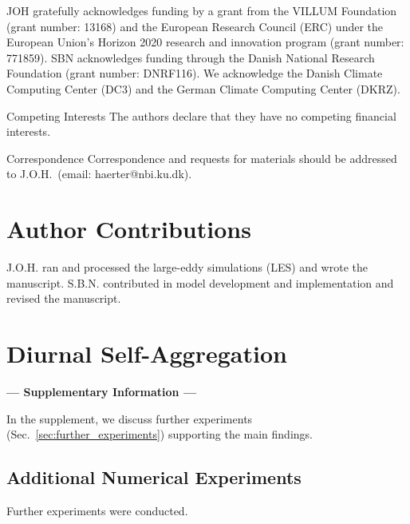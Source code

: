 \documentclass{article}
\begin{document}
\begin{addendum}
 \item JOH gratefully acknowledges funding by a grant from the VILLUM Foundation (grant number: 13168) and the European Research Council (ERC) under the European Union's Horizon 2020 research and innovation program (grant number: 771859). SBN acknowledges funding through the Danish National Research Foundation (grant number: DNRF116).
We acknowledge the Danish Climate Computing Center (DC3) and the German Climate Computing Center (DKRZ).
 \item[Competing Interests] The authors declare that they have no
competing financial interests.
 \item[Correspondence] Correspondence and requests for materials
should be addressed to J.O.H.~(email: haerter@nbi.ku.dk).
\end{addendum}

\section*{Author Contributions}
\noindent
J.O.H. ran and processed the large-eddy simulations (LES) and wrote the manuscript. S.B.N. contributed in model development and implementation and revised the manuscript.

\clearpage
\newpage
\pagebreak


\pagebreak
\clearpage

\renewcommand{\theequation}{S\arabic{equation}}
\renewcommand{\thesection}{S\arabic{section}}
\renewcommand{\thefigure}{S\arabic{figure}}

\setcounter{equation}{0}
\setcounter{figure}{0}
\setcounter{section}{0}

\section*{\Large Diurnal Self-Aggregation }\label{sec:supp}
\noindent
{\bf \large --- Supplementary Information ---}


\noindent
In the supplement, we discuss further experiments (Sec.~\ref{sec:further_experiments}) supporting the main findings.

\subsection*{Additional Numerical Experiments}\label{sec:further_experiments}
Further experiments were conducted.
\end{document}
